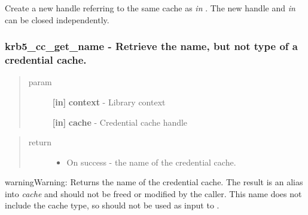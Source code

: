 \documentclass[letterpaper,10pt,english]{sphinxmanual}
\begin{document}
Create a new handle referring to the same cache as \emph{in} . The new handle and \emph{in} can be closed independently.


\subsubsection{krb5\_cc\_get\_name -  Retrieve the name, but not type of a credential cache.}
\label{appdev/refs/api/krb5_cc_get_name::doc}\label{appdev/refs/api/krb5_cc_get_name:krb5-cc-get-name-retrieve-the-name-but-not-type-of-a-credential-cache}

\begin{fulllineitems}
\label{appdev/refs/api/krb5_cc_get_name:krb5_cc_get_name}
\end{fulllineitems}

\begin{quote}\begin{description}
\item[{param}] \leavevmode
\textbf{{[}in{]}} \textbf{context} - Library context

\textbf{{[}in{]}} \textbf{cache} - Credential cache handle

\end{description}\end{quote}
\begin{quote}\begin{description}
\item[{return}] \leavevmode\begin{itemize}
\item {} 
On success - the name of the credential cache.

\end{itemize}

\end{description}\end{quote}

\begin{notice}{warning}{Warning:}
Returns the name of the credential cache. The result is an alias into \emph{cache} and should not be freed or modified by the caller. This name does not include the cache type, so should not be used as input to {\hyperref[appdev/refs/api/krb5_cc_resolve:krb5_cc_resolve]{}} .
\end{notice}
\end{document}
